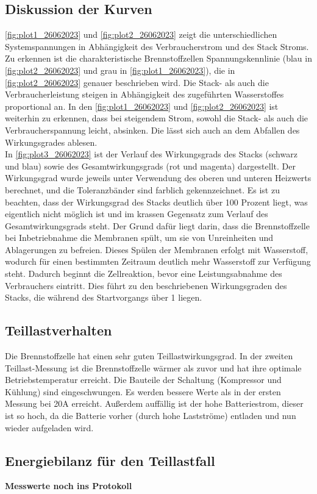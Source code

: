    \subsection{Diskussion der Kurven}
   \autoref{fig:plot1_26062023} und \autoref{fig:plot2_26062023} zeigt die unterschiedlichen Systemspannungen in Abhängigkeit des
Verbraucherstrom und des Stack Stroms. Zu erkennen ist die charakteristische Brennstoffzellen Spannungskennlinie
 (blau in \autoref{fig:plot2_26062023} und grau in  \autoref{fig:plot1_26062023}), die in \autoref{fig:plot2_26062023} genauer beschrieben wird. Die Stack- als auch die Verbraucherleistung
steigen in Abhängigkeit des zugeführten Wasserstoffes proportional an. In den \autoref{fig:plot1_26062023} 
und \autoref{fig:plot2_26062023} ist weiterhin zu erkennen, dass bei
 steigendem Strom, sowohl die Stack- als
auch die Verbraucherspannung leicht, absinken. Die lässt sich auch an dem Abfallen des
Wirkungsgrades ablesen.
\\ In \autoref{fig:plot3_26062023} ist der Verlauf des Wirkungsgrads des Stacks (schwarz und blau) sowie des Gesamtwirkungsgrads (rot und magenta) dargestellt. Der Wirkungsgrad wurde jeweils unter Verwendung des oberen und unteren Heizwerts berechnet, und die Toleranzbänder sind farblich gekennzeichnet. Es ist zu beachten, dass der Wirkungsgrad des Stacks deutlich über 100 Prozent liegt, was eigentlich nicht möglich ist und im krassen Gegensatz zum Verlauf des Gesamtwirkungsgrads steht.
Der Grund dafür liegt darin, dass die Brennstoffzelle bei Inbetriebnahme die Membranen spült, um sie von Unreinheiten und Ablagerungen zu befreien. Dieses Spülen der Membranen erfolgt mit Wasserstoff, wodurch für einen bestimmten Zeitraum deutlich mehr Wasserstoff zur Verfügung steht. Dadurch beginnt die Zellreaktion, bevor eine Leistungsabnahme des Verbrauchers eintritt. Dies führt zu den beschriebenen Wirkungsgraden des Stacks, die während des Startvorgangs über 1 liegen.
\\
\subsection{}
\subsection{Teillastverhalten}

Die Brennstoffzelle hat einen sehr guten Teillastwirkungsgrad. In der zweiten Teillast-Messung ist die Brennstoffzelle wärmer als zuvor und hat ihre optimale Betriebstemperatur erreicht. Die Bauteile der Schaltung (Kompressor und Kühlung) sind eingeschwungen. Es werden bessere Werte als in der ersten Messung bei 20A erreicht. Außerdem auffällig ist der hohe Batteriestrom, dieser ist so hoch, da die Batterie vorher (durch hohe Lastströme) entladen und nun wieder aufgeladen wird. 



\subsection{Energiebilanz für den Teillastfall}

\textbf{Messwerte noch ins Protokoll}
